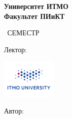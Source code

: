 \begin{titlepage}
	\clearpage\thispagestyle{empty}
	\centering
	
	\textbf{Университет ИТМО \\ Факультет ПИиКТ}
	\vspace{33ex}
	
	{\textbf{\FullCourseNameFirstPart}}
	
	\SemesterNumber\ СЕМЕСТР  
	\vspace{1ex}
	
	Лектор: \textit{\LecturerInitials}
	
	
	\includegraphics[width=0.2\textwidth]{images/logo_ltc.png}

	\begin{flushright}
		\noindent
		Автор: \href{\VKLink}{\textit{\AuthorInitials}}
		\\
	\end{flushright}
	
	\vfill
	\CourseDate
	\pagebreak
\end{titlepage}

